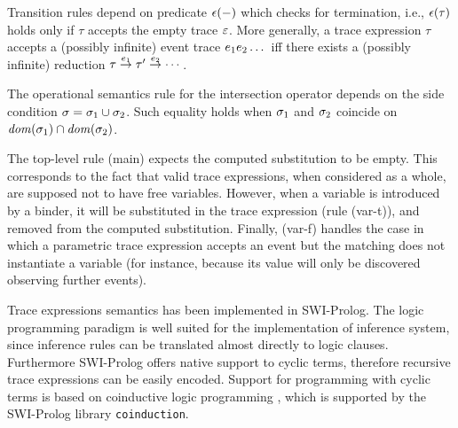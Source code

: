Transition rules depend on predicate \(\mathit{\epsilon}(-)\) which checks for termination, i.e., \(\mathit{\epsilon}(\tau)\) holds only if \(\tau\) accepts the empty trace \(\varepsilon\).
More generally, a trace expression \(\tau\) accepts a (possibly infinite) event trace \(e_1e_2\dots\) iff there exists a (possibly infinite) reduction \(\tau \stackrel{{e_1}}{\rightarrow} \tau' \stackrel{{e_2}}{\rightarrow} \dotsb\).

The operational semantics rule for the intersection operator depends on the side condition \(\sigma=\sigma_1\cup\sigma_2\).
Such equality holds when \(\sigma_1\) and \(\sigma_2\) coincide on \(\mathit{dom}(\sigma_1) \cap \mathit{dom}(\sigma_2)\).

The top-level rule (main) expects the computed substitution to be empty.
This corresponds to the fact that valid trace expressions, when considered as a whole, are supposed not to have free variables.
However, when a variable is introduced by a binder, it will be substituted in the trace expression (rule (var-t)), and removed from the computed substitution.
Finally, (var-f) handles the case in which a parametric trace expression accepts an event but the matching does not instantiate a variable (for instance, because its value will only be discovered observing further events).

Trace expressions semantics has been implemented in SWI-Prolog.
The logic programming paradigm is well suited for the implementation of inference system, since inference rules can be translated almost directly to logic clauses.
Furthermore SWI-Prolog offers native support to cyclic terms, therefore recursive trace expressions can be easily encoded.
Support for programming with cyclic terms is based on coinductive logic programming \cite{CoLP06}, which is supported by the SWI-Prolog library \texttt{coinduction}.
